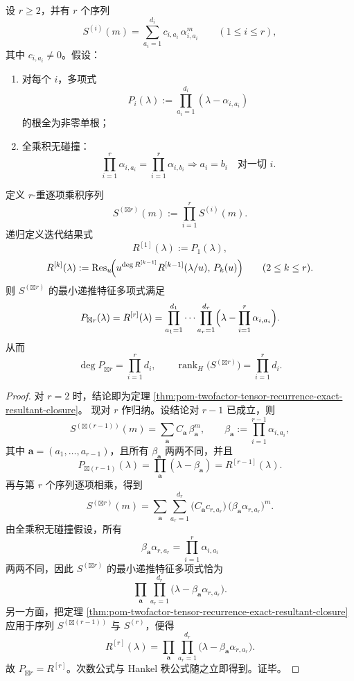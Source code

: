 \begin{theorem}[多因子张量化递推的严格乘法化]\label{thm:pom-multifactor-tensor-recurrence-strict-multiplicativity}
设 \(r\ge 2\)，并有 \(r\) 个序列
\[
S^{(i)}(m)=\sum_{a_i=1}^{d_i} c_{i,a_i}\,\alpha_{i,a_i}^{m}
\qquad
(1\le i\le r),
\]
其中 \(c_{i,a_i}\neq 0\)。假设：
\begin{enumerate}
  \item 对每个 \(i\)，多项式
  \[
  P_i(\lambda):=\prod_{a_i=1}^{d_i}(\lambda-\alpha_{i,a_i})
  \]
  的根全为非零单根；
  \item 全乘积无碰撞：
  \[
  \prod_{i=1}^{r}\alpha_{i,a_i}
  =
  \prod_{i=1}^{r}\alpha_{i,b_i}
  \Longrightarrow
  a_i=b_i\quad\text{对一切 }i.
  \]
\end{enumerate}
定义 \(r\)-重逐项乘积序列
\[
S^{(\boxtimes r)}(m):=\prod_{i=1}^{r}S^{(i)}(m).
\]
递归定义迭代结果式
\[
R^{[1]}(\lambda):=P_1(\lambda),
\]
\[
R^{[k]}(\lambda):=
\operatorname{Res}_{u}\!\Bigl(
u^{\deg R^{[k-1]}}R^{[k-1]}(\lambda/u),\,P_k(u)
\Bigr)
\qquad (2\le k\le r).
\]
则 \(S^{(\boxtimes r)}\) 的最小递推特征多项式满足
\[
P_{\boxtimes r}(\lambda)=R^{[r]}(\lambda)
=
\prod_{a_1=1}^{d_1}\cdots\prod_{a_r=1}^{d_r}
\Bigl(\lambda-\prod_{i=1}^{r}\alpha_{i,a_i}\Bigr).
\]
从而
\[
\deg P_{\boxtimes r}=\prod_{i=1}^{r}d_i,
\qquad
\operatorname{rank}_H\!\bigl(S^{(\boxtimes r)}\bigr)=\prod_{i=1}^{r}d_i.
\]
\end{theorem}
\begin{proof}
对 \(r=2\) 时，结论即为定理
\ref{thm:pom-twofactor-tensor-recurrence-exact-resultant-closure}。
现对 \(r\) 作归纳。设结论对 \(r-1\) 已成立，则
\[
S^{(\boxtimes (r-1))}(m)
=
\sum_{\mathbf a} C_{\mathbf a}\,\beta_{\mathbf a}^{m},
\qquad
\beta_{\mathbf a}:=\prod_{i=1}^{r-1}\alpha_{i,a_i},
\]
其中 \(\mathbf a=(a_1,\dots,a_{r-1})\)，且所有 \(\beta_{\mathbf a}\) 两两不同，并且
\[
P_{\boxtimes (r-1)}(\lambda)
=
\prod_{\mathbf a}(\lambda-\beta_{\mathbf a})
=
R^{[r-1]}(\lambda).
\]
再与第 \(r\) 个序列逐项相乘，得到
\[
S^{(\boxtimes r)}(m)
=
\sum_{\mathbf a}\sum_{a_r=1}^{d_r}
\bigl(C_{\mathbf a}c_{r,a_r}\bigr)\,
\bigl(\beta_{\mathbf a}\alpha_{r,a_r}\bigr)^m.
\]
由全乘积无碰撞假设，所有
\[
\beta_{\mathbf a}\alpha_{r,a_r}
=
\prod_{i=1}^{r}\alpha_{i,a_i}
\]
两两不同，因此 \(S^{(\boxtimes r)}\) 的最小递推特征多项式恰为
\[
\prod_{\mathbf a}\prod_{a_r=1}^{d_r}
\bigl(\lambda-\beta_{\mathbf a}\alpha_{r,a_r}\bigr).
\]
另一方面，把定理
\ref{thm:pom-twofactor-tensor-recurrence-exact-resultant-closure}
应用于序列 \(S^{(\boxtimes(r-1))}\) 与 \(S^{(r)}\)，便得
\[
R^{[r]}(\lambda)
=
\prod_{\mathbf a}\prod_{a_r=1}^{d_r}
\bigl(\lambda-\beta_{\mathbf a}\alpha_{r,a_r}\bigr).
\]
故 \(P_{\boxtimes r}=R^{[r]}\)。次数公式与 Hankel 秩公式随之立即得到。证毕。
\end{proof}
